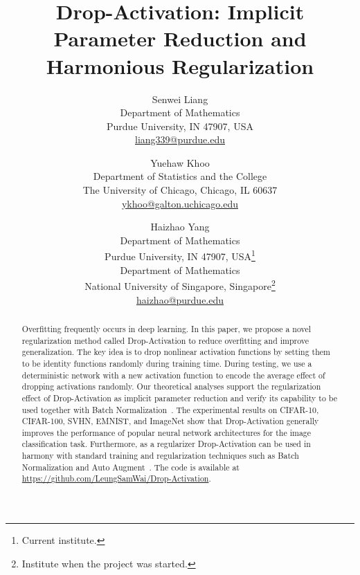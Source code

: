 \documentclass[11pt]{article}
\begin{document}
\title{Drop-Activation: Implicit Parameter Reduction and Harmonious Regularization}
\author{Senwei Liang \\ Department of Mathematics\\ Purdue University, IN 47907, USA\\ \href{mailto:liang339@purdue.edu}{liang339@purdue.edu}
        \and Yuehaw Khoo\\ Department of Statistics and the College\\ The University of Chicago, Chicago, IL 60637\\ \href{mailto:ykhoo@galton.uchicago.edu}{ykhoo@galton.uchicago.edu}
         \and Haizhao Yang \\ Department of Mathematics\\ Purdue University, IN 47907, USA\footnote{Current institute.}\\Department of Mathematics\\ National University of Singapore, Singapore\footnote{Institute when the project was started.}\\
          \href{mailto:haizhao@purdue.edu}{haizhao@purdue.edu} }

\maketitle

\begin{abstract}
Overfitting frequently occurs in deep learning. In this paper, we propose a novel regularization method called Drop-Activation to reduce overfitting and improve generalization. The key idea is to drop nonlinear activation functions by setting them to be identity functions randomly during training time. During testing, we use a deterministic network with a new activation function to encode the average effect of dropping activations randomly. Our theoretical analyses support the regularization effect of Drop-Activation as implicit parameter reduction and verify its capability to be used together with Batch Normalization~\cite{bn}. The experimental results on CIFAR-10, CIFAR-100, SVHN, EMNIST, and ImageNet show that Drop-Activation generally improves the performance of popular neural network architectures for the image classification task. Furthermore, as a regularizer Drop-Activation can be used in harmony with standard training and regularization techniques such as Batch Normalization and Auto Augment~\cite{autoaugment}. The code is available at \url{https://github.com/LeungSamWai/Drop-Activation}.
\end{abstract}
\end{document}
